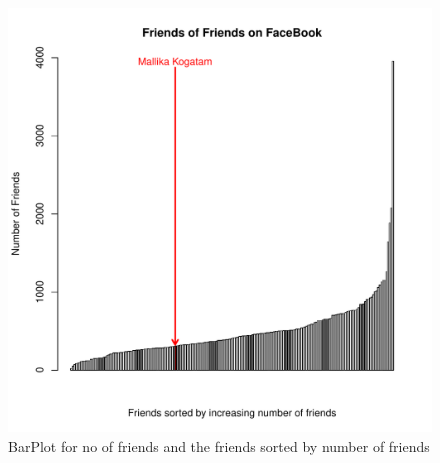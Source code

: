 \begin{figure}
	 \begin{center}
		\includegraphics[scale=0.8]{fb/fb_barplot.pdf}
		\caption{BarPlot for no of friends and the friends sorted by number of friends}
		\label{fig:q2-1}
 	\end{center}
\end{figure}